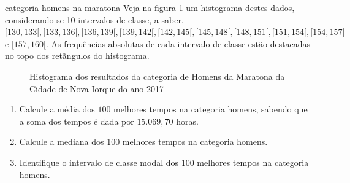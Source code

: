 \begin{task}{ categoria homens na maratona}
Veja na \hyperref[maratona-homens1]{figura \ref{maratona-homens1}}  um histograma destes dados, considerando-se 10 intervalos de classe, a saber, $[130, 133[, [133, 136[, [136,139[, [139,142[, [142,145[, [145,148[,[148,151[, [151,154[, [154, 157[$ e $[157,160[$. As frequências absolutas de cada intervalo de classe estão destacadas no topo dos retãngulos do histograma.


\begin{figure}[H]
\centering

\caption{Histograma dos resultados da categoria de Homens da Maratona da Cidade de Nova Iorque do ano 2017}
\label{maratona-homens1}
\end{figure}


\begin{enumerate}
\item {} 
Calcule a média dos $100$ melhores tempos na categoria homens, sabendo que a soma dos tempos é dada por $15.069{,}70$ horas.

\item {} 
Calcule a mediana dos 100 melhores tempos na categoria homens.

\item {} 
Identifique o intervalo de classe modal dos 100 melhores tempos na categoria homens.


\end{enumerate}
\end{task}
